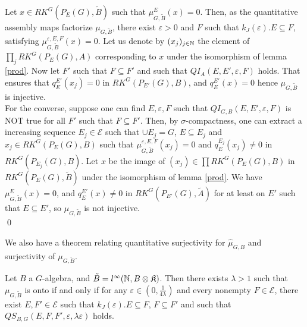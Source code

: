 \begin{dem}
Let $x\in RK^G(P_E(G),\tilde B)$ such that $\mu_{G,\tilde B}^E(x)=0$. Then, as the quantitative assembly maps factorize $\mu_{G,\tilde B}$, there exist $\varepsilon>0$ and $F$ such that $k_J(\varepsilon). E \subseteq F$, satisfying $\mu_{G,\tilde B}^{\varepsilon,E,F}(x)=0$. Let us denote by $(x_j)_{j\in \mathbb N}$ the element of $\prod_j RK^G(P_E(G),A)$ corresponding to $x$ under the isomorphism of lemma \ref{prod}. Now let $F'$ such that $F\subseteq F'$ and such that $QI_{A}(E,E',\varepsilon,F)$ holds. That ensures that $q_E^{E'}(x_j)=0$ in $RK^G(P_{E'}(G),B)$, and $q_E^{E'}(x)=0$ hence $\mu_{G,\tilde B}$ is injective.\\


For the converse, suppose one can find $E,\varepsilon,F$ such that $QI_{G,B}(E,E',\varepsilon,F)$ is NOT true for all $F'$ such that $F\subseteq F'$. Then, by $\sigma$-compactness, one can extract a increasing sequence $E_j\in \mathcal E$ such that $\cup E_j =G$, $E\subseteq E_j$ and $x_j\in RK^G(P_E(G),B)$ such that $\mu_{G,\tilde B}^{\varepsilon,E,F}(x_j)=0$ and $q_E^{E_j}(x_j)\neq 0$ in $RK^G(P_{E_j}(G),B)$. Let $x$ be the image of $(x_j)\in \prod RK^G(P_E(G),B)$ in $RK^G(P_E(G),\tilde B)$ under the isomorphism of lemma \ref{prod}. We have $\mu_{G,\tilde B}^E(x)=0$, and $q_E^{E'}(x)\neq 0$ in $RK^G(P_{E'}(G),\tilde A)$ for at least on $E'$ such that $E\subseteq E'$, so $\mu_{G,\tilde B}$ is not injective. \\
\qed   
\end{dem}

We also have a theorem relating quantitative surjectivity for $\hat\mu_{G,B}$ and surjectivity of $\mu_{G,\tilde B}$.

\begin{thm}\label{Quant2}
Let $B$ a $G$-algebra, and $\tilde B = l^\infty(\mathbb N,B\otimes \mathfrak K)$. Then there exists $\lambda>1$ such that $\mu_{G,\tilde B}$ is onto if and only if for any $\varepsilon\in ( 0 ,\frac{1}{4\lambda})$ and every nonempty $F\in\mathcal E$, there exist $E,F'\in\mathcal E$ such that  $k_J(\varepsilon) .E \subseteq F$, $F\subseteq F'$ and such that $QS_{B,G}(E,F,F',\varepsilon,\lambda\varepsilon)$ holds.
\end{thm}

